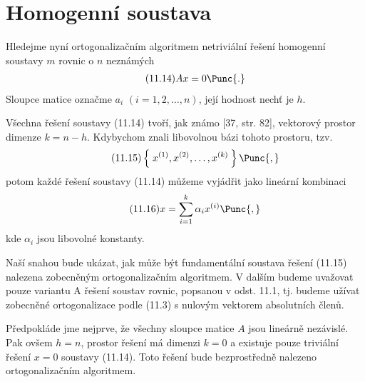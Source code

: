 \section{Homogenní soustava}

Hledejme nyní ortogonalizačním algoritmem netriviální řešení
homogenní soustavy $m$ rovnic o $n$ neznámých
%
\begin{align*}
  \tag{11.14}
  A x = 0 \Punc{.}
\end{align*}
%
Sloupce matice \Amxn označme $a_i$ $(i=1,2,\ldots,n)$, její hodnost
nechť je $h$.

Všechna řešení soustavy (11.14) tvoří, jak známo [37, str. 82],
vektorový prostor dimenze $k=n-h$. Kdybychom znali libovolnou bázi
tohoto prostoru, tzv.  
%
\begin{align*}
  \tag{11.15}
  \left\{\; x^{(1)}, x^{(2)}, \ldots, x^{(k)\;}\right\} \Punc{,}
\end{align*}
%
potom každé řešení soustavy (11.14) můžeme vyjádřit jako
lineární kombinaci
%
\begin{align*}
  \tag{11.16}
  x = \sum_{i=1}^k \alpha_i x^{(i)} \Punc{,}
\end{align*}
%
kde $\alpha_i$ jsou libovolné konstanty.


Naší snahou bude ukázat, jak může být fundamentální soustava
řešení (11.15) nalezena zobecněným ortogonalizačním algoritmem.
V dalším budeme uvažovat pouze variantu A řešení soustav rovnic,
popsanou v odst. 11.1, tj. budeme užívat zobecněné
ortogonalizace podle (11.3) s nulovým vektorem absolutních členů.

Předpokláde jme nejprve, že všechny sloupce matice $A$ jsou
lineárně nezávislé. Pak ovšem $h=n$, prostor řešení má dimenzi $k=0$
a existuje pouze triviální řešení $x=0$ soustavy (11.14). Toto
řešení bude bezprostředně nalezeno ortogonalizačním algoritmem.

